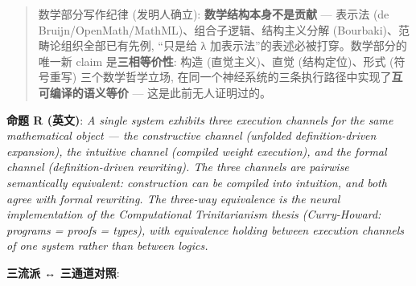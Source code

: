 \documentclass[
]{article}
\begin{document}
\begin{quote}
数学部分写作纪律 (发明人确立): \textbf{数学结构本身不是贡献} --- 表示法
(de Bruijn/OpenMath/MathML)、组合子逻辑、结构主义分解
(Bourbaki)、范畴论组织全部已有先例, ``只是给 λ
加表示法''的表述必被打穿。数学部分的唯一新 claim 是\textbf{三相等价性}:
构造 (直觉主义)、直觉 (结构定位)、形式 (符号重写) 三个数学哲学立场,
在同一个神经系统的三条执行路径中实现了\textbf{互可编译的语义等价} ---
这是此前无人证明过的。
\end{quote}

\textbf{命题 R (英文)}: \emph{A single system exhibits three execution
channels for the same mathematical object --- the constructive channel
(unfolded definition-driven expansion), the intuitive channel (compiled
weight execution), and the formal channel (definition-driven rewriting).
The three channels are pairwise semantically equivalent: construction
can be compiled into intuition, and both agree with formal rewriting.
The three-way equivalence is the neural implementation of the
Computational Trinitarianism thesis (Curry-Howard: programs = proofs =
types), with equivalence holding between execution channels of one
system rather than between logics.}

\textbf{三流派 ↔ 三通道对照}:
\end{document}
